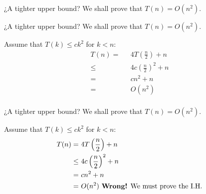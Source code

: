 \documentclass{beamer}
\begin{document}
\begin{frame}{¿A tighter upper bound?}
    We shall prove that $T(n) = O(n^2)$.
\end{frame}

\begin{frame}{¿A tighter upper bound?}
    We shall prove that $T(n) = O(n^2)$.
    
    \begin{block}{}
        Assume that $T(k) \leq ck^2$ for $k < n$:
        \begin{align*}
            T(n) = & \text{ }4T \left(\frac{n}{2} \right) + n \\
                \leq & \text{ }4c \left(\frac{n}{2} \right)^2 + n \\
                   = & \text{ }cn^2 + n \\
                   = & \text{ }O(n^2) \\
        \end{align*}
    \end{block}
\end{frame}

\begin{frame}{¿A tighter upper bound?}
    We shall prove that $T(n) = O(n^2)$.
    
    \begin{block}{}
        Assume that $T(k) \leq ck^2$ for $k < n$:
        \begin{align*}
            T(n) = & \text{ }4T \left(\frac{n}{2} \right) + n \\
                \leq & \text{ }4c \left(\frac{n}{2} \right)^2 + n \\
                   = & \text{ }cn^2 + n \\
                   = & \text{ }O(n^2) \text{ \textbf{Wrong!} We must prove the I.H.}\\
        \end{align*}
    \end{block}
\end{frame}
\end{document}
